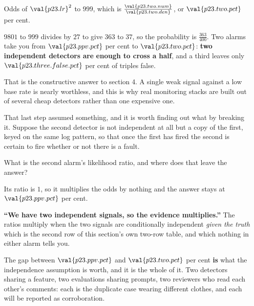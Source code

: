 \begin{fr}
\begin{ansblock}
Odds of $\val{p23.lr}^{2}$ to $999$, which is
$\frac{\val{p23.two.num}}{\val{p23.two.den}}$, or $\val{p23.two.pct}$ per cent.
\end{ansblock}

$9801$ to $999$ divides by $27$ to give $363$ to $37$, so the probability is
$\frac{363}{400}$. Two alarms take you from $\val{p23.ppv.pct}$ per cent to
$\val{p23.two.pct}$: \textbf{two independent detectors are enough to cross a
half}, and a third leaves only
$\val{p23.three.false.pct}$ per cent of triples false.

That is the constructive answer to section 4. A single weak signal against a
low base rate is nearly worthless, and this is why real monitoring stacks are
built out of several cheap detectors rather than one expensive one.

\end{fr}

\begin{fr}
That last step assumed something, and it is worth finding out what by breaking
it. Suppose the second detector is not independent at all but a copy of the
first, keyed on the same log pattern, so that once the first has fired the
second is certain to fire whether or not there is a fault.

What is the second alarm's likelihood ratio, and where does that leave the
answer?
\dotline
\nextframe
\end{fr}

\begin{fr}
\begin{ansblock}
Its ratio is $1$, so it multiplies the odds by nothing and the answer stays at
$\val{p23.ppv.pct}$ per cent.
\end{ansblock}

\begin{trapbox}
\textbf{\enquote{We have two independent signals, so the evidence multiplies.}}
The ratios multiply when the two signals are conditionally independent
\emph{given the truth} \dash{} which is the second row of this section's own
two-row table, and which nothing in either alarm tells you.

The gap between $\val{p23.ppv.pct}$ and $\val{p23.two.pct}$ per cent
\textbf{is} what the independence assumption is worth, and it is the whole of
it. Two detectors sharing a feature, two evaluations sharing prompts, two
reviewers who read each other's comments: each is the duplicate case wearing
different clothes, and each will be reported as corroboration.
\end{trapbox}
\end{fr}

